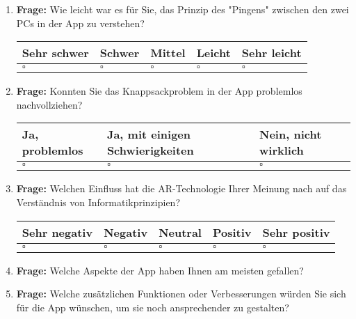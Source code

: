 \documentclass{article}
\begin{document}
\begin{enumerate}[left=0pt, after=\vspace{1\baselineskip}] %
    \item \textbf{Frage: } Wie leicht war es für Sie, das Prinzip des "Pingens" zwischen den zwei PCs in der App zu verstehen?
        \begin{center}
        \begin{tabularx}{\textwidth}{|Y|Y|Y|Y|Y|}
            \hline
            Sehr schwer & Schwer & Mittel & Leicht & Sehr leicht \\
            \hline
            $\square$ & $\square$ & $\square$ & $\square$ & $\square$ \\
            \hline
        \end{tabularx}
        \end{center}
        
    \item \textbf{Frage: } Konnten Sie das Knappsackproblem in der App problemlos nachvollziehen? 
        \begin{center}
        \begin{tabularx}{\textwidth}{|Y|Y|Y|}
            \hline
            Ja, problemlos & Ja, mit einigen Schwierigkeiten & Nein, nicht wirklich \\
            \hline
            $\square$ & $\square$ & $\square$ \\
            \hline
        \end{tabularx}
        \end{center}
        
    \item \textbf{Frage: } Welchen Einfluss hat die AR-Technologie Ihrer Meinung nach auf das Verständnis von Informatikprinzipien?
        \begin{center}
        \begin{tabularx}{\textwidth}{|Y|Y|Y|Y|Y|}
            \hline
            Sehr negativ & Negativ & Neutral & Positiv & Sehr positiv \\
            \hline
            $\square$ & $\square$ & $\square$ & $\square$ & $\square$ \\
            \hline
        \end{tabularx}
        \end{center}
        
    \item \textbf{Frage: } Welche Aspekte der App haben Ihnen am meisten gefallen?
    
    \vspace{5\baselineskip} %
    
    \item \textbf{Frage: } Welche zusätzlichen Funktionen oder Verbesserungen würden Sie sich für die App wünschen, um sie noch ansprechender zu gestalten?
\end{enumerate}
\end{document}
